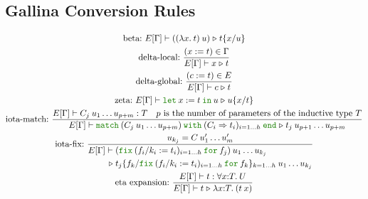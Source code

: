 \documentclass[a4paper,fleqn]{article}
\def\gallina{\textrm{Gallina}}
\newcommand{\kwlet}{\mbox{\color{mygreen}\ttfamily let}}
\newcommand{\kwin}{\mbox{\color{mygreen}\ttfamily in}}
\newcommand{\kwmatch}{\mbox{\color{mygreen}\ttfamily match}}
\newcommand{\kwwith}{\mbox{\color{mygreen}\ttfamily with}}
\newcommand{\kwend}{\mbox{\color{mygreen}\ttfamily end}}
\newcommand{\kwfix}{\mbox{\color{mygreen}\ttfamily fix}}
\newcommand{\kwfor}{\mbox{\color{mygreen}\ttfamily for}}
\newcommand{\lam}[2]{\lambda #1.\:#2}
\newcommand{\lamT}[3]{\lambda #1\mathord{:}#2.\:#3}
\newcommand{\prodT}[3]{\forall #1\mathord{:}#2.\:#3}
\newcommand{\letin}[3]{\kwlet\:#1:=#2\:\kwin\:#3}
\newcommand{\match}[4]{\kwmatch\:#1\:\kwwith\:(#2 \Rightarrow #3)_{#4}\:\kwend}
\newcommand{\fix}[4]{\kwfix\:(#1 := #2)_{#3}\:\kwfor\:#4}
\newcommand{\WT}[4]{\ensuremath{#1[#2] \vdash #3 : #4}}
\newcommand{\WTE}[3]{\WT{E}{#1}{#2}{#3}}
\newcommand{\WTEG}[2]{\WTE{\Gamma}{#1}{#2}}
\newcommand{\subst}[3]{#1\{#2/#3\}}
\newcommand{\reltri}{\mathrel{\triangleright}}
\begin{document}
\subsection{\gallina{} Conversion Rules}\label{sec:conversion-rules}

\begin{gather*}
  \text{beta:}~
    E[\Gamma] \vdash ((\lam{x}{t})\:u) \reltri \subst{t}{x}{u} \\
  \text{delta-local:}~
    \dfrac{(x:=t) \in \Gamma}{E[\Gamma] \vdash x \reltri t} \\
  \text{delta-global:}~
    \dfrac{(c:=t) \in E}{E[\Gamma] \vdash c \reltri t} \\
  \text{zeta:}~
    E[\Gamma] \vdash \letin{x}{t}{u} \reltri \subst{u}{x}{t} \\
  \text{iota-match:}~
    \dfrac
    {
      E[\Gamma] \vdash C_j\:u_1\ldots u_{p+m} : T \quad
      \text{$p$ is the number of parameters of the inductive type $T$}
    }{
      E[\Gamma] \vdash
      \match{(C_j\:u_1\ldots u_{p+m})}{C_i}{t_i}{i=1\ldots h}
      \reltri
      t_j\:u_{p+1}\ldots u_{p+m}
    } \\
  \text{iota-fix:}~
    \dfrac{
      u_{k_j} = C\:u'_1\ldots u'_m
    }{
      \begin{aligned}
        E[\Gamma] \vdash\; &
          (\fix{f_i/k_i}{t_i}{i=1\ldots h}{f_j})\:u_1 \ldots u_{k_j} \\
        \reltri\; &
          \subst{t_j}{f_k}{\fix{f_i/k_i}{t_i}{i=1\ldots h}{f_k}}_{k=1\ldots h} \:u_1 \ldots u_{k_j}
      \end{aligned}
    } \\
  \text{eta expansion:}~
    \dfrac{\WTEG{t}{\prodT{x}{T}{U}}}{E[\Gamma] \vdash t \reltri \lamT{x}{T}{(t\:x)}}
\end{gather*}
\raggedright
\end{document}
